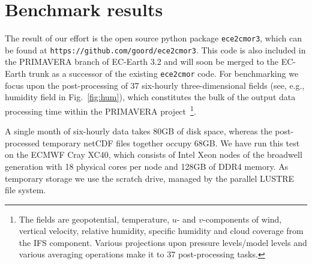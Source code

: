 \documentclass[procedia]{easychair}
\begin{document}
\section{Benchmark results}
The result of our effort is the open source python package \texttt{ece2cmor3}, 
which can be found at \texttt{https://github.com/goord/ece2cmor3}. This code is 
also included in the PRIMAVERA branch of EC-Earth 3.2 and will soon be merged 
to the EC-Earth trunk as a successor of the existing \texttt{ece2cmor} code. 
For benchmarking we focus upon the post-processing of 37 six-hourly 
three-dimensional fields (see, e.g., humidity field in Fig.~\ref{fig:hum}), 
which constitutes the bulk of the output data 
processing time within the PRIMAVERA project~\footnote{The fields are 
geopotential, temperature, $u$- and $v$-components of wind, vertical velocity, 
relative humidity, specific humidity and cloud coverage from the IFS 
component. Various projections upon pressure levels/model levels and 
various averaging operations make it to 37 post-processing tasks.}.
  
A single month of six-hourly data takes 80GB of disk space, whereas the 
post-processed temporary netCDF files together occupy 68GB. We have run this 
test on the ECMWF Cray XC40, which consists of Intel Xeon nodes of the 
broadwell generation with 18 physical cores per node and 128GB of DDR4 memory. 
As temporary storage we use the scratch drive, managed by the parallel LUSTRE 
file system.
\end{document}
